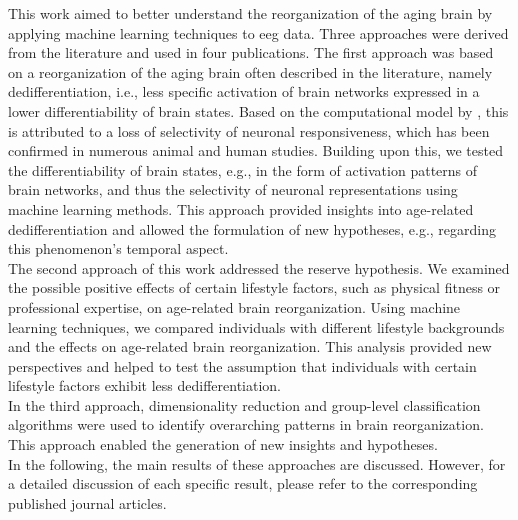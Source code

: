 This work aimed to better understand the reorganization of the aging brain by applying machine learning techniques to \gls{eeg} data. Three approaches were derived from the literature and used in four publications.
The first approach was based on a reorganization of the aging brain often described in the literature, namely dedifferentiation, i.e., less specific activation of brain networks expressed in a lower differentiability of brain states. Based on the computational model by \citeauthor{Li2001} \cite{Li2001, Li2000}, this is attributed to a loss of selectivity of neuronal responsiveness, which has been confirmed in numerous animal and human studies. Building upon this, we tested the differentiability of brain states, e.g., in the form of activation patterns of brain networks, and thus the selectivity of neuronal representations using machine learning methods. This approach provided insights into age-related dedifferentiation and allowed the formulation of new hypotheses, e.g., regarding this phenomenon's temporal aspect.\\
The second approach of this work addressed the reserve hypothesis. We examined the possible positive effects of certain lifestyle factors, such as physical fitness or professional expertise, on age-related brain reorganization. Using machine learning techniques, we compared individuals with different lifestyle backgrounds and the effects on age-related brain reorganization. This analysis provided new perspectives and helped to test the assumption that individuals with certain lifestyle factors exhibit less dedifferentiation.\\
In the third approach, dimensionality reduction and group-level classification algorithms were used to identify overarching patterns in brain reorganization. This approach enabled the generation of new insights and hypotheses.\\
In the following, the main results of these approaches are discussed. However, for a detailed discussion of each specific result, please refer to the corresponding published journal articles.\\

